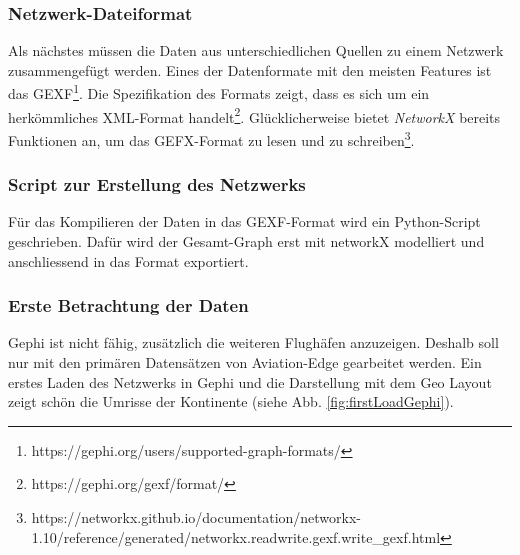 \subsubsection{Netzwerk-Dateiformat}
\label{subsec:networkFileformat}
Als nächstes müssen die Daten aus unterschiedlichen Quellen zu einem Netzwerk zusammengefügt werden.
Eines der Datenformate mit den meisten Features ist das GEXF\footnote{https://gephi.org/users/supported-graph-formats/}.
Die Spezifikation des Formats zeigt, dass es sich um ein herkömmliches XML-Format handelt\footnote{https://gephi.org/gexf/format/}.
Glücklicherweise bietet \textit{NetworkX} bereits Funktionen an, um das GEFX-Format zu lesen und zu schreiben\footnote{https://networkx.github.io/documentation/networkx-1.10/reference/generated/networkx.readwrite.gexf.write\_gexf.html}.


\subsubsection{Script zur Erstellung des Netzwerks}
Für das Kompilieren der Daten in das GEXF-Format wird ein Python-Script geschrieben.
Dafür wird der Gesamt-Graph erst mit networkX modelliert und anschliessend in das Format exportiert.






\subsubsection{Erste Betrachtung der Daten}
Gephi ist nicht fähig, zusätzlich die weiteren Flughäfen anzuzeigen.
Deshalb soll nur mit den primären Datensätzen von Aviation-Edge gearbeitet werden.
Ein erstes Laden des Netzwerks in Gephi und die Darstellung mit dem \guillemotleft Geo Layout \guillemotright zeigt
schön die Umrisse der Kontinente (siehe Abb. \ref{fig:firstLoadGephi}).

